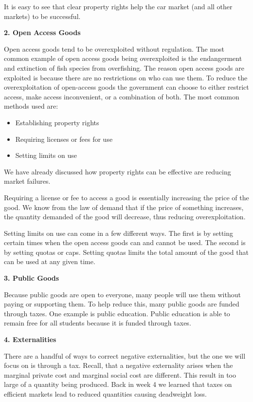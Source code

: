 \documentclass[
]{book}
\providecommand{\tightlist}{%
  \setlength{\itemsep}{0pt}\setlength{\parskip}{0pt}}
\begin{document}
It is easy to see that clear property rights help the car market (and all other markets) to be successful.

\textbf{2. Open Access Goods}

Open access goods tend to be overexploited without regulation. The most common example of open access goods being overexploited is the endangerment and extinction of fish species from overfishing. The reason open access goods are exploited is because there are no restrictions on who can use them. To reduce the overexploitation of open-access goods the government can choose to either restrict access, make access inconvenient, or a combination of both. The most common methods used are:

\begin{itemize}
\tightlist
\item
  Establishing property rights
\item
  Requiring licenses or fees for use
\item
  Setting limits on use
\end{itemize}

We have already discussed how property rights can be effective are reducing market failures.

Requiring a license or fee to access a good is essentially increasing the price of the good. We know from the law of demand that if the price of something increases, the quantity demanded of the good will decrease, thus reducing overexploitation.

Setting limits on use can come in a few different ways. The first is by setting certain times when the open access goods can and cannot be used. The second is by setting quotas or caps. Setting quotas limits the total amount of the good that can be used at any given time.

\textbf{3. Public Goods}

Because public goods are open to everyone, many people will use them without paying or supporting them. To help reduce this, many public goods are funded through taxes. One example is public education. Public education is able to remain free for all students because it is funded through taxes.

\textbf{4. Externalities}

There are a handful of ways to correct negative externalities, but the one we will focus on is through a tax. Recall, that a negative externality arises when the marginal private cost and marginal social cost are different. This result in too large of a quantity being produced. Back in week 4 we learned that taxes on efficient markets lead to reduced quantities causing deadweight loss.
\end{document}

